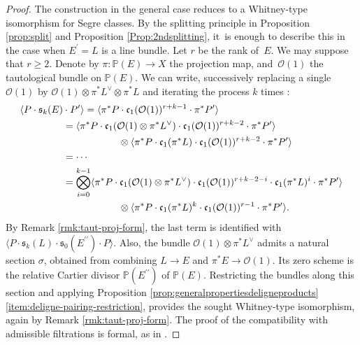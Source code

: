 \documentclass[JEP,XML,SOM,Unicode,published]{cedram}
\theoremstyle{plain}
\theoremstyle{definition}
\newcommand{\PBbb}{\mathbb P}
\newcommand{\Ocal}{\mathcal O}
\newcommand{\cfrak}{\mathfrak c}
\newcommand{\sfrak}{\mathfrak s}
\newcommand{\bis}{\prime\prime}
\begin{document}
\begin{proof}
The construction in the general case reduces to a Whitney-type isomorphism for Segre classes. By the splitting principle in Proposition \ref{prop:split} and Proposition \ref{Prop:2ndsplitting}, it~is enough to describe this in the case when $E^{\prime}=L$ is a line bundle. Let $r$ be the rank of~$E$. We may suppose that $r\geq 2$. Denote by $\pi\colon\PBbb(E)\to X$ the projection map, and~$\Ocal(1)$ the tautological bundle on $\PBbb(E)$. We can write, successively replacing a single~$\Ocal(1)$ by $\Ocal(1) \otimes \pi^{\ast} L^{\vee} \otimes \pi^\ast L $ and iterating the process $k$ times :
\begin{equation}\label{eq:SegreWhitney}
\begin{split}
\langle P \cdot \sfrak_k(E) &{}\cdot P' \rangle = \langle \pi^{\ast}P\cdot \cfrak_1(\Ocal(1))^{r+k-1} \cdot \pi^{\ast}P' \rangle \\
&= \langle \pi^{\ast}P\cdot \cfrak_1(\Ocal(1) \otimes \pi^{\ast}L^\vee) \cdot \cfrak_1(\Ocal(1))^{r+k-2}\cdot \pi^{\ast}P' \rangle\\
&\hspace*{2cm}\otimes \langle \pi^{\ast}P\cdot \cfrak_1(\pi^{\ast}L)\cdot\cfrak_1(\Ocal(1))^{r+k-2} \cdot \pi^{\ast}P' \rangle \\
&=\cdots\\
&= \bigotimes_{i=0}^{k-1} \langle \pi^{\ast}P \cdot \cfrak_1(\Ocal(1) \otimes \pi^{\ast} L^\vee) \cdot \cfrak_1(\Ocal(1))^{r+k-2-i} \cdot \cfrak_1(\pi^\ast L)^{i} \cdot \pi^{\ast}P'\rangle \\
&\hspace*{2cm}\otimes \langle \pi^{\ast}P \cdot \cfrak_1(\pi^\ast L)^{k} \cdot \cfrak_1(\Ocal(1))^{r-1} \cdot \pi^{\ast}P'\rangle.
\end{split}
\end{equation}
By Remark \ref{rmk:taut-proj-form}, the last term is identified with $\langle P \cdot \sfrak_k(L) \cdot \sfrak_0(E^{\bis}) \cdot P \rangle$. Also, the bundle $\Ocal(1) \otimes \pi^\ast L^\vee$ admits a natural section $\sigma$, obtained from combining $L \to E$ and $\pi^\ast E \to \Ocal(1)$. Its zero scheme is the relative Cartier divisor $\PBbb(E^{\bis})$ of $\PBbb(E)$. Restricting the bundles along this section and applying Proposition \ref{prop:generalpropertiesdeligneproducts}\eqref{item:deligne-pairing-restriction}, provides the sought Whitney-type isomorphism, again by Remark \ref{rmk:taut-proj-form}. The proof of the compatibility with admissible filtrations is formal, as in \cite[\textsection V.2.3]{Elkikfib}.


\end{proof}
\end{document}
